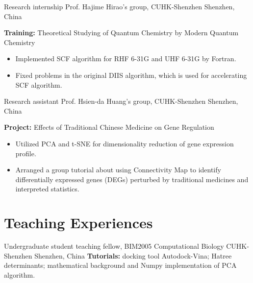 \documentclass[11pt]{moderncv}
\begin{document}
{Research internship}
{Prof. Hajime Hirao's group, CUHK-Shenzhen}
{Shenzhen, China}
{}
{\textbf{Training:} Theoretical Studying of Quantum Chemistry by Modern Quantum Chemistry
    \begin{itemize}\setlength\itemsep{-1pt}
    \item Implemented SCF algorithm for RHF 6-31G  and UHF 6-31G  by Fortran.
    \item Fixed problems in the original DIIS algorithm, which is used for accelerating SCF algorithm.
\end{itemize}
}

{Research assistant}
{Prof. Hsien-da Huang's group, CUHK-Shenzhen}
{Shenzhen, China}
{}
{\textbf {Project:} Effects of Traditional Chinese Medicine on Gene Regulation
    \begin{itemize}\setlength\itemsep{-1pt}
    \item Utilized PCA and t-SNE for dimensionality reduction of gene expression profile.
    \item Arranged a group tutorial about using Connectivity Map to identify differentially expressed genes (DEGs) perturbed by traditional medicines and interpreted statistics. 
    \end{itemize}
}

\vspace{-0.75em}
\nocite{*}
\printbibliography[title={Publications}]
\vspace{-0.75em}

\vspace{-0.75em}
\section{Teaching Experiences}
{Undergraduate student teaching fellow, BIM2005 Computational Biology}
{CUHK-Shenzhen}
{Shenzhen, China}
{}
{\textbf{Tutorials:} docking tool Autodock-Vina; 
Hatree determinants; 
mathematical background and Numpy implementation of PCA algorithm.}
\end{document}
